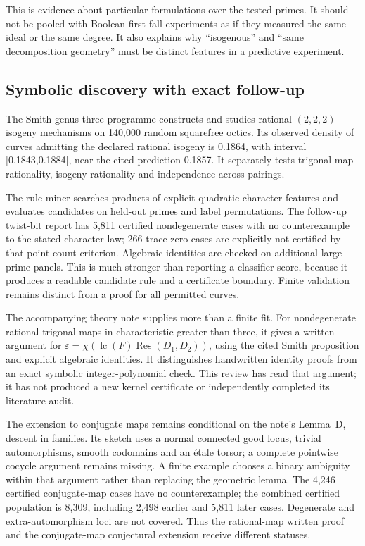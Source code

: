 This is evidence about particular formulations over the tested primes.
It should not be pooled with Boolean first-fall experiments as if they
measured the same ideal or the same degree. It also explains why
``isogenous'' and ``same decomposition geometry'' must be distinct
features in a predictive experiment.

\subsection{Symbolic discovery with exact follow-up}

The Smith genus-three programme constructs and studies rational
$(2,2,2)$-isogeny mechanisms on 140,000 random squarefree octics. Its
observed density of curves admitting the declared rational isogeny is
0.1864, with interval [0.1843,0.1884], near the cited prediction 0.1857.
It separately tests trigonal-map rationality, isogeny rationality and
independence across pairings.

The rule miner searches products of explicit quadratic-character
features and evaluates candidates on held-out primes and label
permutations. The follow-up twist-bit report has 5,811 certified
nondegenerate cases with no counterexample to the stated character law;
266 trace-zero cases are explicitly not certified by that point-count
criterion. Algebraic identities are checked on additional large-prime
panels. This is much stronger than reporting a classifier score, because
it produces a readable candidate rule and a certificate boundary.
Finite validation remains distinct from a proof for all permitted
curves.

The accompanying theory note supplies more than a finite fit. For
nondegenerate rational trigonal maps in characteristic greater than three,
it gives a written argument for
$\varepsilon=\chi(\operatorname{lc}(F)\operatorname{Res}(D_1,D_2))$,
using the cited Smith proposition and explicit algebraic identities.
It distinguishes handwritten identity proofs from an exact symbolic
integer-polynomial check. This review has read that argument; it has not
produced a new kernel certificate or independently completed its literature
audit.

The extension to conjugate maps remains conditional on the note's
Lemma~D, descent in families. Its sketch uses a normal connected good
locus, trivial automorphisms, smooth codomains and an \'etale torsor;
a complete pointwise cocycle argument remains missing. A finite example
chooses a binary ambiguity within that argument rather than replacing
the geometric lemma. The 4,246 certified conjugate-map cases have no
counterexample; the combined certified population is 8,309, including
2,498 earlier and 5,811 later cases. Degenerate and extra-automorphism
loci are not covered. Thus the rational-map written proof and the
conjugate-map conjectural extension receive different statuses.

